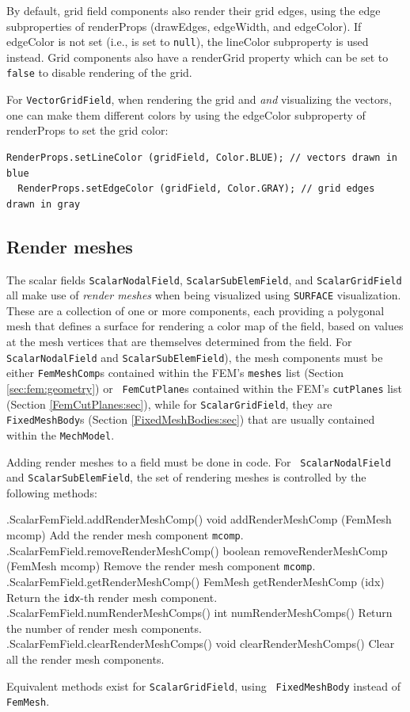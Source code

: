 By default, grid field components also render their grid edges, using
the edge subproperties of {\sf renderProps} ({\sf drawEdges}, {\sf
edgeWidth}, and {\sf edgeColor}). If {\sf edgeColor} is not set (i.e.,
is set to {\tt null}), the {\sf lineColor} subproperty is used instead.
Grid components also have a {\sf renderGrid} property which can be set
to {\tt false} to disable rendering of the grid.

For {\tt VectorGridField}, when rendering the grid and {\it and}
visualizing the vectors, one can make them different colors by using
the {\sf edgeColor} subproperty of {\sf renderProps} to set the grid
color:
%
\begin{lstlisting}[]
  RenderProps.setLineColor (gridField, Color.BLUE); // vectors drawn in blue
  RenderProps.setEdgeColor (gridField, Color.GRAY); // grid edges drawn in gray
\end{lstlisting}
%

\subsection{Render meshes}
\label{renderingMeshes:sec}

The scalar fields {\tt ScalarNodalField}, {\tt ScalarSubElemField},
and {\tt ScalarGridField} all make use of {\it render meshes} when
being visualized using {\tt SURFACE} visualization. These are a
collection of one or more components, each providing a polygonal mesh
that defines a surface for rendering a color map of the field, based
on values at the mesh vertices that are themselves determined from the
field.  For {\tt ScalarNodalField} and {\tt ScalarSubElemField}), the
mesh components must be either {\tt FemMeshComp}s contained within the
FEM's {\tt meshes} list (Section \ref{sec:fem:geometry}) or {\tt
FemCutPlane}s contained within the FEM's {\tt cutPlanes} list
(Section \ref{FemCutPlanes:sec}), while for {\tt ScalarGridField},
they are {\tt FixedMeshBody}s (Section \ref{FixedMeshBodies:sec}) that
are usually contained within the {\tt MechModel}.

Adding render meshes to a field must be done in code. For {\tt
ScalarNodalField} and {\tt ScalarSubElemField}, the set of rendering
meshes is controlled by the following methods:
%
\begin{methodtable}{0.55}{0.45}
\midline
%
\methodentry
{\fields.ScalarFemField.addRenderMeshComp()}
{void addRenderMeshComp (FemMesh mcomp)}%
{Add the render mesh component {\tt mcomp}.}%
%
\methodentry
{\fields.ScalarFemField.removeRenderMeshComp()}%
{boolean removeRenderMeshComp (FemMesh mcomp)}%
{Remove the render mesh component {\tt mcomp}.}%
%
\methodentry
{\fields.ScalarFemField.getRenderMeshComp()}%
{FemMesh getRenderMeshComp (idx)}%
{Return the {\tt idx}-th render mesh component.}%
%
\methodentry
{\fields.ScalarFemField.numRenderMeshComps()}%
{int numRenderMeshComps()}%
{Return the number of render mesh components.}%
%
\methodentry
{\fields.ScalarFemField.clearRenderMeshComps()}%
{void clearRenderMeshComps()}%
{Clear all the render mesh components.}%
%
\midline
\end{methodtable}
%
Equivalent methods exist for {\tt ScalarGridField}, using {\tt
FixedMeshBody} instead of {\tt FemMesh}.

